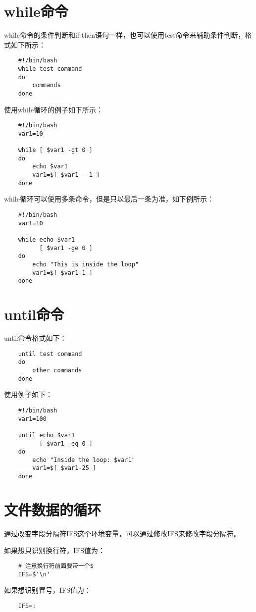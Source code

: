 \documentclass[a4paper,left=1.5cm,right=1.5cm,11pt]{article}
\begin{document}
\section{while命令}
	while命令的条件判断和if-then语句一样，也可以使用test命令来辅助条件判断，格式如下所示：
	\begin{lstlisting}
	#!/bin/bash
	while test command
	do
		commands
	done
	\end{lstlisting}

	使用while循环的例子如下所示：
	\begin{lstlisting}
	#!/bin/bash
	var1=10

	while [ $var1 -gt 0 ]
	do
		echo $var1
		var1=$[ $var1 - 1 ]
	done
	\end{lstlisting}

	while循环可以使用多条命令，但是只以最后一条为准，如下例所示：
	\begin{lstlisting}
	#!/bin/bash
	var1=10

	while echo $var1
		  [ $var1 -ge 0 ]
	do
		echo "This is inside the loop"
		var1=$[ $var1-1 ]
	done
	\end{lstlisting}

\section{until命令}
	until命令格式如下：
	\begin{lstlisting}
	until test command
	do
		other commands
	done
	\end{lstlisting}

	使用例子如下：
	\begin{lstlisting}
	#!/bin/bash
	var1=100

	until echo $var1
		  [ $var1 -eq 0 ]
	do
		echo "Inside the loop: $var1"
		var1=$[ $var1-25 ]
	done
	\end{lstlisting}

\section{文件数据的循环}
	通过改变字段分隔符IFS这个环境变量，可以通过修改IFS来修改字段分隔符。\par
	如果想只识别换行符，IFS值为：
	\begin{lstlisting}
	# 注意换行符前面要带一个$
	IFS=$'\n'
	\end{lstlisting}

	如果想识别冒号，IFS值为：
	\begin{lstlisting}
	IFS=:
	\end{lstlisting}
\end{document}
